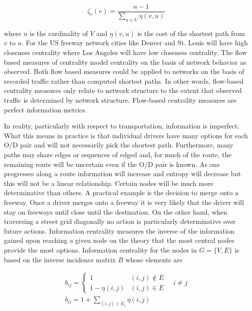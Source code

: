\documentclass[12pt]{article}
\begin{document}
\begin{equation}
	\zeta_c(v) = \frac{n - 1}{\sum_{u \in U} \eta(v, u)}
\end{equation}

where $n$ is the cardinality of $V$ and $\eta(v, u)$ is the cost of the shortest path from $v$ to $u$. For the US freeway network cities like Denver and St. Louis will have high closeness centrality where Los Angeles will have low closeness centrality. The flow based measures of centrality model centrality on the basis of network behavior as observed. Both flow based measures could be applied to networks on the basis of recorded traffic rather than computed shortest paths. In other words, flow-based centrality measures only relate to network structure to the extent that observed traffic is determined by network structure. Flow-based centrality measures are perfect information metrics.

In reality, particularly with respect to transportation, information is imperfect. What this means in practice is that individual drivers have many options for each O/D pair and will not necessarily pick the shortest path. Furthermore, many paths may share edges or sequences of edged and, for much of the route, the remaining route will be uncertain even if the O/D pair is known. As one progresses along a route information will increase and entropy will decrease but this will not be a linear relationship. Certain nodes will be much more determinative than others. A practical example is the decision to merge onto a freeway. Once a driver merges onto a freeway it is very likely that the driver will stay on freeways until close until the destination. On the other hand, when traversing a street grid diagonally no action is particularly determinative over future actions. Information centrality measures the inverse of the information gained upon reaching a given node on the theory that the most central nodes provide the most options. Information centrality for the nodes in $G = \{V, E\}$ is based on the inverse incidence matrix $B$ whose elements are

\begin{align}
	b_{ij} = \begin{cases}
		1 & (i, j) \not\in E \\
		1 - \eta(i, j) & (i, j) \in E
	\end{cases}\quad i\neq j \\
	b_{ii} = 1 + \sum_{(i, j) \in E_i} \eta(i, j)
\end{align}
\end{document}
